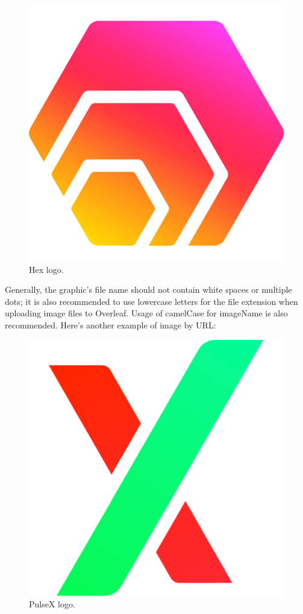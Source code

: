 \documentclass[12pt, letterpaper]{article}
\begin{document}
\begin{figure}
    \centering
    \includegraphics[scale=0.25]{images/hex.png}
    \caption{Hex logo.}
    \label{fig:Hex label}
\end{figure}

Generally, the graphic’s file name should not contain white spaces or multiple dots; it is also recommended to use lowercase letters for the file extension when uploading image files to Overleaf. Usage of camelCase for imageName is also recommended. Here's another example of image by URL:

\begin{figure}
    \centering
    \includegraphics[scale=0.3]{pulsex}
    \caption{PulseX logo.}
    \label{fig:PulseX Label}
\end{figure}
\end{document}
